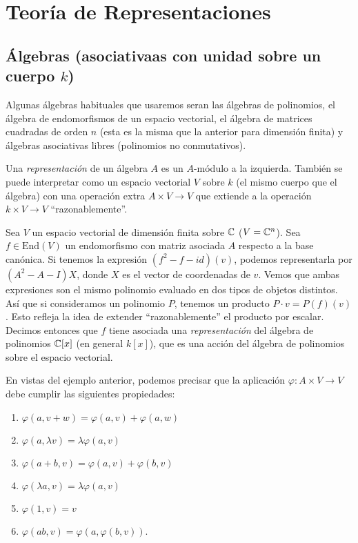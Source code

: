 \documentclass[ANAyTR.tex]{subfiles}
\begin{document}

\chapter{Teoría de Representaciones}
\section{Álgebras (asociativaas con unidad sobre un cuerpo $k$)}
Algunas álgebras habituales que usaremos seran las álgebras de polinomios, el álgebra de endomorfismos de un espacio vectorial, el álgebra de matrices cuadradas de orden $n$ (esta es la misma que la anterior para dimensión finita) y álgebras asociativas libres (polinomios no conmutativos). 

\begin{defi}
Una \emph{representación} de un álgebra $A$ es un $A$-módulo a la izquierda. También se puede interpretar como un espacio vectorial $V$ sobre $k$ (el mismo cuerpo que el álgebra) con una operación extra $A\times V\to V$ que extiende a la operación $k\times V\to V$ ``razonablemente''. 
\end{defi}

\begin{ej}
Sea $V$ un espacio vectorial de dimensión finita sobre $\mathbb{C}$ ($V=\mathbb{C}^n$). Sea $f\in\mathrm{End}(V)$ un endomorfismo con matriz asociada $A$ respecto a la base canónica. Si tenemos la expresión $(f^2-f-id)(v)$, podemos representarla por $(A^2-A-I)X$, donde $X$ es el vector de coordenadas de $v$. Vemos que ambas expresiones son el mismo polinomio evaluado en dos tipos de objetos distintos. Así que si consideramos un polinomio $P$, tenemos un producto $P\cdot v=P(f)(v)$. Esto refleja la idea de extender ``razonablemente'' el producto por escalar. Decimos entonces que $f$ tiene asociada una \emph{representación} del álgebra de polinomios $\mathbb{C}[x]$ (en general $k[x]$), que es una acción del álgebra de polinomios sobre el espacio vectorial.
\end{ej}


En vistas del ejemplo anterior, podemos precisar que la aplicación $\varphi:A\times V\to V$ debe cumplir las siguientes propiedades:
\begin{enumerate}
\item $\varphi(a,v+w)=\varphi(a,v)+\varphi(a,w)$
\item $\varphi(a,\lambda v)=\lambda\varphi(a,v)$
\item $\varphi(a+b,v)=\varphi(a,v)+\varphi(b,v)$
\item $\varphi(\lambda a,v)=\lambda\varphi(a,v)$
\item $\varphi(1,v)=v$
\item $\varphi(ab,v)=\varphi(a,\varphi(b,v))$. 
\end{enumerate}
\end{document}
